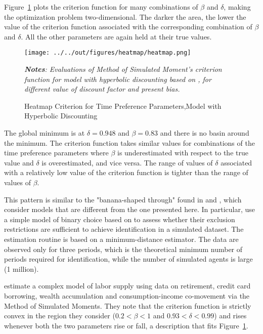 Figure~\ref{fig:heatmap} plots the criterion function for many combinations of $\beta$ and $\delta$, making the optimization problem two-dimensional. The darker the area, the lower the value of the criterion function associated with the corresponding combination of $\beta$ and $\delta$. All the other parameters are again held at their true values.

\begin{figure}[!t]
\centering
\captionsetup{justification=centering}
\caption{Heatmap Criterion for Time Preference Parameters,\newline Model with Hyperbolic Discounting}
\label{fig:heatmap}
\begin{center}
\texttt{[image: ../../out/figures/heatmap/heatmap.png]}
\end{center}
\footnotesize
\raggedright
\textit{\textbf{Notes}: Evaluations of Method of Simulated Moment's criterion function for model with hyperbolic discounting based on \textcite{KeaneWolpin1994}, for different value of discount factor and present bias.}
\end{figure}

The global minimum is at $\delta = 0.948$ and $\beta = 0.83$ and there is no basin around the minimum. The criterion function takes similar values for combinations of the time preference parameters where $\beta$ is underestimated with respect to the true value and $\delta$ is overestimated, and vice versa. The range of values of $\delta$ associated with a relatively low value of the criterion function is tighter than the range of values of $\beta$. 

This pattern is similar to the "banana-shaped through" found in \textcite{Abbring2018} and \textcite{LaibsonRepetto2007}, which consider models that are different from the one presented here. In particular, \textcite{Abbring2018} use a simple model of binary choice based on \textcite{Rust1987} to assess whether their exclusion restrictions are sufficient to achieve identification in a simulated dataset. The estimation routine is based on a minimum-distance estimator. The data are observed only for three periods, which is the theoretical minimum number of periods required for identification, while the number of simulated agents is large (1 million). 

\textcite{LaibsonRepetto2007} estimate a complex model of labor supply using data on retirement, credit card borrowing, wealth accumulation and consumption-income co-movement via the Method of Simulated Moments. 
They note that the criterion function is strictly convex in the region they consider ($0.2 < \beta < 1$ and $0.93 < \delta < 0.99$) and rises whenever both the two parameters rise or fall, a description that fits Figure~\ref{fig:heatmap}.

